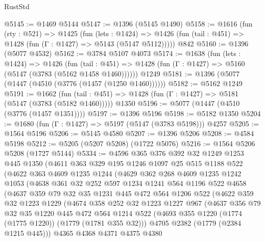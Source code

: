 \begin{lexlean}{RustStd}
\begin{coremodule}
{\begin{coremodule}
{{{{{{{{{{{@5145 := @1469 @5144
@5147 := @1396 (@5145 @1490)
@5158 := @1616
    (fun (rty : @521) =>
    @1425
      (fun (lets : @1424) =>
      @1426 (fun (tail : @451) => @1428 (fun (Γ : @1427) => @5143 (@5147 @5112)))))
    @842
@5160 := @1396 (@5077 @4532)
@5162 := @3784 @5107 @4073
@5174 := @1638
    (fun (lets : @1424) =>
    @1426
      (fun (tail : @451) => @1428 (fun (Γ : @1427) => @5160 (@5147 (@3783 (@5162 @1458 @1460))))))
    @1249
@5181 := @1396 (@5077 (@1447 (@4510 (@3776 (@1457 (@1250 @1460))))))
@5182 := @5162 @1249
@5191 := @1662
    (fun (tail : @451) => @1428 (fun (Γ : @1427) => @5181 (@5147 (@3783 (@5182 @1460)))))
    @1350
@5196 := @5077 (@1447 (@4510 (@3776 (@1457 @1351))))
@5197 := @1396 @5196
@5198 := @5182 @1350
@5204 := @1680 (fun (Γ : @1427) => @5197 (@5147 (@3783 @5198))) @4257
@5205 := @1564 @5196
@5206 := @5145 @4580
@5207 := @1396 @5206
@5208 := @4584 @5198
@5212 := @5205 (@5207 @5208) (@1722 @5076)
@5216 := @1564 @5206 @5208 (@1727 @5144)
@5334 := @4596
    @365
    @376
    @392
    @32
    @1249
    @1253
    @445
    @1350
    (@4611
      @363
      @329
      @195
      @1246
      @1097
      @25
      @515
      @1188
      @522
      (@4622
        @363
        @4609
        @1235
        @1244
        (@4629
          @362
          @268
          @4609
          @1235
          @1242
          @1053
          (@4638
            @361
            @32
            @252
            @597
            @1234
            @1241
            @564
            @1196
            @522
            @4658
            (@4637
              @359
              @79
              @32
              @35
              @1231
              @445
              @472
              @564
              @1206
              @522
              (@4622
                @359
                @32
                @1223
                @1229
                (@4674
                  @358
                  @252
                  @32
                  @1223
                  @1227
                  @967
                  (@4637
                    @356
                    @79
                    @32
                    @35
                    @1220
                    @445
                    @472
                    @564
                    @1214
                    @522
                    (@4693 @355 @1220 (@1774 (@1775 @1220)) (@1779 (@1781 @355 @32)))
                    @4705
                    @2382
                    (@1779 (@2384 @1215 @445)))
                  @4365
                  @4368
                  @4371
                  @4375
                  @4380
}}}}}}}}}}}
\end{coremodule}}
\end{coremodule}
\end{lexlean}
